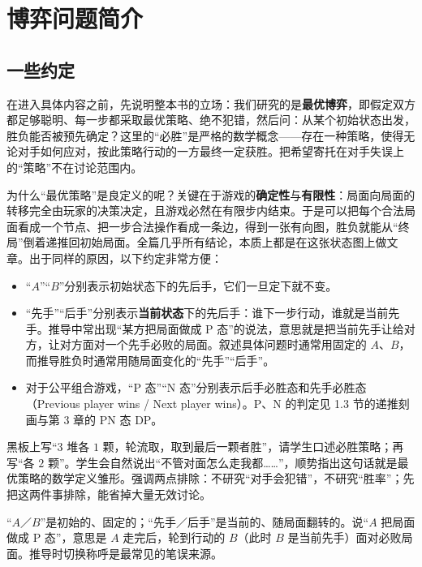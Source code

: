 

\chapter{博弈问题简介}
\section{一些约定}
在进入具体内容之前，先说明整本书的立场：我们研究的是\textbf{最优博弈}，即假定双方都足够聪明、每一步都采取最优策略、绝不犯错，然后问：从某个初始状态出发，胜负能否被预先确定？这里的“必胜”是严格的数学概念——存在一种策略，使得无论对手如何应对，按此策略行动的一方最终一定获胜。把希望寄托在对手失误上的“策略”不在讨论范围内。

为什么“最优策略”是良定义的呢？关键在于游戏的\textbf{确定性}与\textbf{有限性}：局面向局面的转移完全由玩家的决策决定，且游戏必然在有限步内结束。于是可以把每个合法局面看成一个节点、把一步合法操作看成一条边，得到一张有向图，胜负就能从“终局”倒着递推回初始局面。全篇几乎所有结论，本质上都是在这张状态图上做文章。出于同样的原因，以下约定非常方便：
\begin{itemize}
\item “$A$”“$B$”分别表示初始状态下的先后手，它们一旦定下就不变。
\item “先手”“后手”分别表示\textbf{当前状态}下的先后手：谁下一步行动，谁就是当前先手。推导中常出现“某方把局面做成 P 态”的说法，意思就是把当前先手让给对方，让对方面对一个先手必败的局面。叙述具体问题时通常用固定的 $A$、$B$，而推导胜负时通常用随局面变化的“先手”“后手”。
\item 对于公平组合游戏，“P 态”“N 态”分别表示后手必胜态和先手必胜态（Previous player wins / Next player wins）。P、N 的判定见 1.3 节的递推刻画与第 3 章的 PN 态 DP。
\end{itemize}

\begin{teach}[导入：从“必胜”这个词开始]
黑板上写“$3$ 堆各 $1$ 颗，轮流取，取到最后一颗者胜”，请学生口述必胜策略；再写“各 $2$ 颗”。学生会自然说出“不管对面怎么走我都……”，顺势指出这句话就是最优策略的数学定义雏形。强调两点排除：不研究“对手会犯错”，不研究“胜率”；先把这两件事排除，能省掉大量无效讨论。
\end{teach}
\begin{pitfall}[两套称呼不要混用]
“$A$／$B$”是初始的、固定的；“先手／后手”是当前的、随局面翻转的。说“$A$ 把局面做成 P 态”，意思是 $A$ 走完后，轮到行动的 $B$（此时 $B$ 是当前先手）面对必败局面。推导时切换称呼是最常见的笔误来源。
\end{pitfall}

